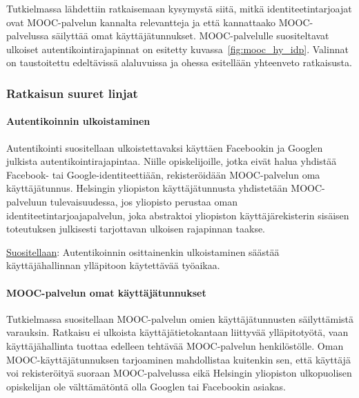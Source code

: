 \documentclass[finnish,gradu]{tktltiki}
\begin{document}
  Tutkielmassa lähdettiin ratkaisemaan kysymystä siitä, mitkä identiteetintarjoajat ovat MOOC-palvelun kannalta relevantteja ja että kannattaako MOOC-palvelussa säilyttää omat käyttäjätunnukset. MOOC-palvelulle suositeltavat ulkoiset autentikointirajapinnat on esitetty kuvassa~\ref{fig:mooc_hy_idp}. Valinnat on taustoitettu edeltävissä alaluvuissa ja ohessa esitellään yhteenveto ratkaisusta.

  \newpage

  \subsubsection{Ratkaisun suuret linjat} %
  \label{ssub:ratkaisun_suuret_linjat}

  \paragraph{Autentikoinnin ulkoistaminen} \hfill  %
  \label{par:autentikoinnin_ulkoistaminen}

  Autentikointi suositellaan ulkoistettavaksi käyttäen Facebookin ja Googlen julkista autentikointirajapintaa. Niille opiskelijoille, jotka eivät halua yhdistää Facebook- tai Google-identiteettiään, rekisteröidään MOOC-palvelun oma käyttäjätunnus. Helsingin yliopiston käyttäjätunnusta yhdistetään MOOC-palveluun tulevaisuudessa, jos yliopisto perustaa oman identiteetintarjoajapalvelun, joka abstraktoi yliopiston käyttäjärekisterin sisäisen toteutuksen julkisesti tarjottavan ulkoisen rajapinnan taakse.

  \underline{Suositellaan}: Autentikoinnin osittainenkin ulkoistaminen säästää käyttäjähallinnan ylläpitoon käytettävää työaikaa.

  \paragraph{MOOC-palvelun omat käyttäjätunnukset} \hfill %
  \label{par:mooc_palvelun_omat_käyttäjätunnukset}

  Tutkielmassa suositellaan MOOC-palvelun omien käyttäjätunnusten säilyttämistä varauksin. Ratkaisu ei ulkoista käyttäjätietokantaan liittyvää ylläpitotyötä, vaan käyttäjähallinta tuottaa edelleen tehtävää MOOC-palvelun henkilöstölle. Oman MOOC-käyttäjätunnuksen tarjoaminen mahdollistaa kuitenkin sen, että käyttäjä voi rekisteröityä suoraan MOOC-palvelussa eikä Helsingin yliopiston ulkopuolisen opiskelijan ole välttämätöntä olla Googlen tai Facebookin asiakas.
\end{document}
